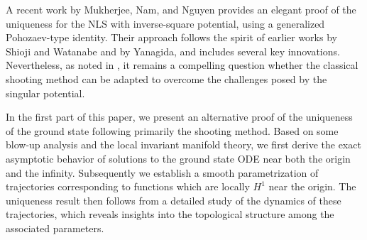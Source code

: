 \documentclass[12pt]{amsart}
\begin{document}
A recent work by Mukherjee, Nam, and Nguyen \cite{MNN21} provides an elegant proof of the uniqueness for the NLS with inverse-square potential, using a generalized Pohozaev-type identity. Their approach follows the spirit of earlier works \cite{SW13} by Shioji and Watanabe and \cite{Y91} by Yanagida,  and includes several key innovations. Nevertheless, as noted in \cite{MNN21}, it remains a compelling question whether the classical shooting method can be adapted to overcome the challenges posed by the singular potential.

In the first part of this paper, we present an alternative proof of the uniqueness of the ground state following primarily the shooting method. Based on some blow-up analysis and the local invariant manifold theory, we first derive the exact asymptotic behavior of solutions to the ground state ODE near both the origin and the infinity. Subsequently we establish a smooth parametrization of trajectories corresponding to functions which are locally $H^1$  near the origin. The uniqueness result then follows from a detailed study of the dynamics of these trajectories, which reveals insights into the topological structure among the associated parameters.
    
\end{document}
